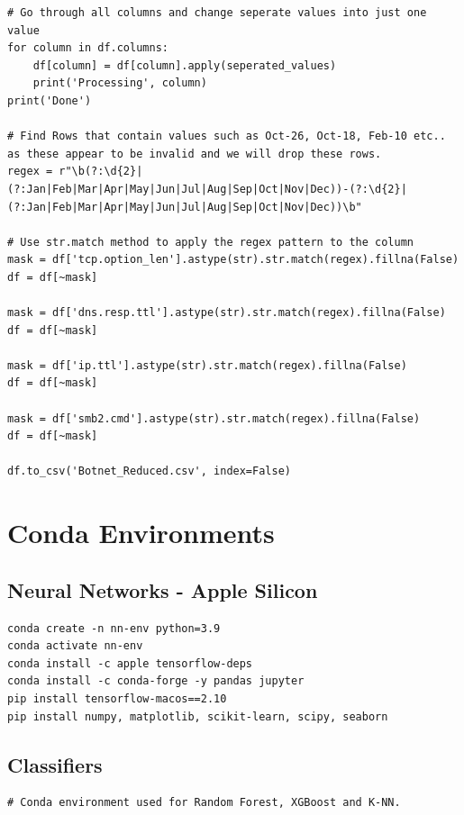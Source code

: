 \begin{appendices}
\begin{lstlisting}
# Go through all columns and change seperate values into just one value
for column in df.columns:
    df[column] = df[column].apply(seperated_values)
    print('Processing', column)
print('Done')

# Find Rows that contain values such as Oct-26, Oct-18, Feb-10 etc.. as these appear to be invalid and we will drop these rows.
regex = r"\b(?:\d{2}|(?:Jan|Feb|Mar|Apr|May|Jun|Jul|Aug|Sep|Oct|Nov|Dec))-(?:\d{2}|(?:Jan|Feb|Mar|Apr|May|Jun|Jul|Aug|Sep|Oct|Nov|Dec))\b"

# Use str.match method to apply the regex pattern to the column
mask = df['tcp.option_len'].astype(str).str.match(regex).fillna(False)
df = df[~mask]

mask = df['dns.resp.ttl'].astype(str).str.match(regex).fillna(False)
df = df[~mask]

mask = df['ip.ttl'].astype(str).str.match(regex).fillna(False)
df = df[~mask]

mask = df['smb2.cmd'].astype(str).str.match(regex).fillna(False)
df = df[~mask]

df.to_csv('Botnet_Reduced.csv', index=False)    

\end{lstlisting}

\newpage

\section{Conda Environments}
\label{appx: Conda_Env}

\subsection{Neural Networks - Apple Silicon}

\begin{lstlisting}
conda create -n nn-env python=3.9
conda activate nn-env
conda install -c apple tensorflow-deps
conda install -c conda-forge -y pandas jupyter
pip install tensorflow-macos==2.10
pip install numpy, matplotlib, scikit-learn, scipy, seaborn
\end{lstlisting}

\subsection{Classifiers}

\begin{lstlisting}
# Conda environment used for Random Forest, XGBoost and K-NN.


\end{lstlisting}
\end{appendices}
